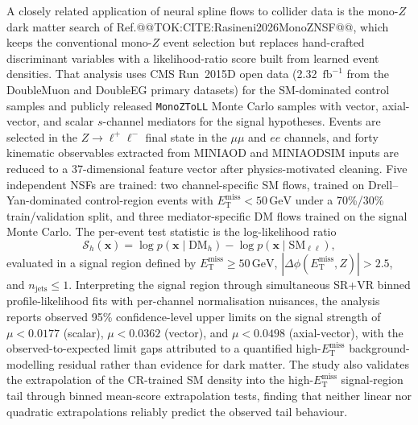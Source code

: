 \documentclass[11pt]{article}
\newcommand{\GeV}{\text{GeV}}
\newcommand{\MET}{\ensuremath{E_{\mathrm{T}}^{\mathrm{miss}}}}
\begin{document}
A closely related application of neural spline flows to collider data is the mono-$Z$ dark matter search of Ref.@@TOK:CITE:Rasineni2026MonoZNSF@@, which keeps the conventional mono-$Z$ event selection but replaces hand-crafted discriminant variables with a likelihood-ratio score built from learned event densities. That analysis uses CMS Run~2015D open data (2.32~$\mathrm{fb}^{-1}$ from the DoubleMuon and DoubleEG primary datasets) for the SM-dominated control samples and publicly released \texttt{MonoZToLL} Monte Carlo samples with vector, axial-vector, and scalar $s$-channel mediators for the signal hypotheses. Events are selected in the $Z\to\ell^+\ell^-$ final state in the $\mu\mu$ and $ee$ channels, and forty kinematic observables extracted from MINIAOD and MINIAODSIM inputs are reduced to a 37-dimensional feature vector after physics-motivated cleaning. Five independent NSFs are trained: two channel-specific SM flows, trained on Drell--Yan-dominated control-region events with $\MET<50\,\GeV$ under a 70\%/30\% train/validation split, and three mediator-specific DM flows trained on the signal Monte Carlo. The per-event test statistic is the log-likelihood ratio
\begin{equation*}
\mathcal{S}_h(\mathbf{x}) = \log p(\mathbf{x}\mid\mathrm{DM}_h) - \log p(\mathbf{x}\mid\mathrm{SM}_{\ell\ell}),
\end{equation*}
evaluated in a signal region defined by $\MET\ge 50\,\GeV$, $|\Delta\phi(\MET, Z)| > 2.5$, and $n_{\mathrm{jets}} \le 1$. Interpreting the signal region through simultaneous SR+VR binned profile-likelihood fits with per-channel normalisation nuisances, the analysis reports observed 95\% confidence-level upper limits on the signal strength of $\mu<0.0177$ (scalar), $\mu<0.0362$ (vector), and $\mu<0.0498$ (axial-vector), with the observed-to-expected limit gaps attributed to a quantified high-$\MET$ background-modelling residual rather than evidence for dark matter. The study also validates the extrapolation of the CR-trained SM density into the high-$\MET$ signal-region tail through binned mean-score extrapolation tests, finding that neither linear nor quadratic extrapolations reliably predict the observed tail behaviour.
\end{document}
